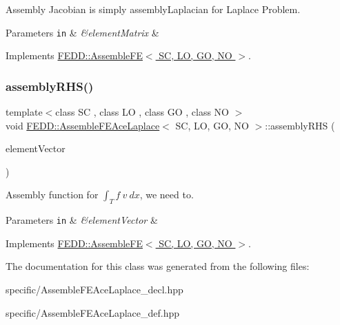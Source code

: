 Assembly Jacobian is simply assembly\+Laplacian for Laplace Problem. 


\begin{DoxyParams}[1]{Parameters}
\mbox{\tt in}  & {\em \&element\+Matrix} & \\
\hline
\end{DoxyParams}


Implements \hyperlink{classFEDD_1_1AssembleFE}{F\+E\+D\+D\+::\+Assemble\+F\+E$<$ S\+C, L\+O, G\+O, N\+O $>$}.

\mbox{\label{classFEDD_1_1AssembleFEAceLaplace_abbd14669795dbf1282dc70652c56c163}} 
\subsubsection{\texorpdfstring{assembly\+R\+H\+S()}{assemblyRHS()}}
{\footnotesize\ttfamily template$<$class SC , class LO , class GO , class NO $>$ \\
void \hyperlink{classFEDD_1_1AssembleFEAceLaplace}{F\+E\+D\+D\+::\+Assemble\+F\+E\+Ace\+Laplace}$<$ SC, LO, GO, NO $>$\+::assembly\+R\+HS (\begin{DoxyParamCaption}\item[{Multi\+Vector\+Ptr\+\_\+\+Type \&}]{element\+Vector }\end{DoxyParamCaption})\hspace{0.3cm}{\ttfamily [virtual]}}



Assembly function for $ \int_T f ~ v ~dx $, we need to. 


\begin{DoxyParams}[1]{Parameters}
\mbox{\tt in}  & {\em \&element\+Vector} & \\
\hline
\end{DoxyParams}


Implements \hyperlink{classFEDD_1_1AssembleFE}{F\+E\+D\+D\+::\+Assemble\+F\+E$<$ S\+C, L\+O, G\+O, N\+O $>$}.



The documentation for this class was generated from the following files\+:\begin{DoxyCompactItemize}
\item 
specific/Assemble\+F\+E\+Ace\+Laplace\+\_\+decl.\+hpp\item 
specific/Assemble\+F\+E\+Ace\+Laplace\+\_\+def.\+hpp\end{DoxyCompactItemize}
